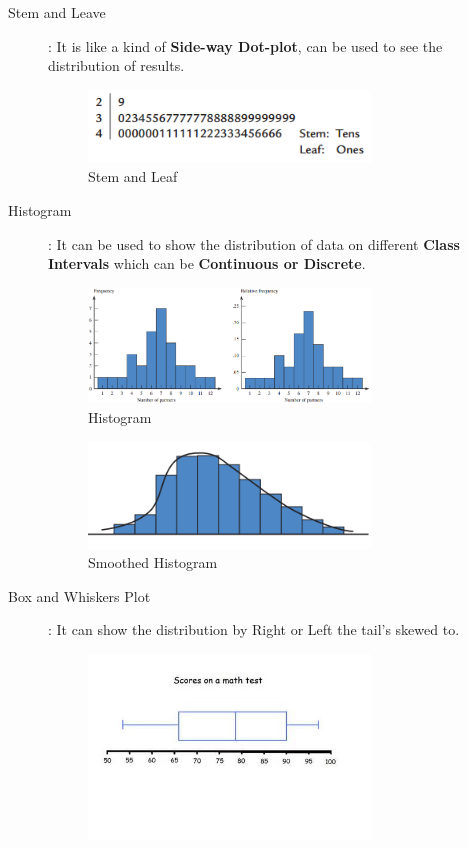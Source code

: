 \begin{description}
\begin{description}
        \item[Stem and Leave]: It is like a kind of \textbf{Side-way Dot-plot}, can be used to see the distribution of results.
        \begin{figure}[H]
            \centering
            \includegraphics[width=75mm]{stem_leaf.png}
            \caption{Stem and Leaf}
            \label{fig:my_label}
        \end{figure}
        \item[Histogram]: It can be used to show the distribution of data on different \textbf{Class Intervals} which can be \textbf{Continuous or Discrete}.
        \begin{figure}[H]
            \centering
            \includegraphics[width=75mm]{histogram.png}
            \caption{Histogram}
            \label{histogram}
        \end{figure}
        \begin{figure}[H]
            \centering
            \includegraphics[width=75mm]{smoothed_histogram.png}
            \caption{Smoothed Histogram}
            \label{smoothed histogram}
        \end{figure}
        \item[Box and Whiskers Plot]: It can show the distribution by Right or Left the tail's skewed to.
        \begin{figure}[H]
            \centering
            \includegraphics[width=75mm]{th.jpg}

\end{figure}
\end{description}
\end{description}
